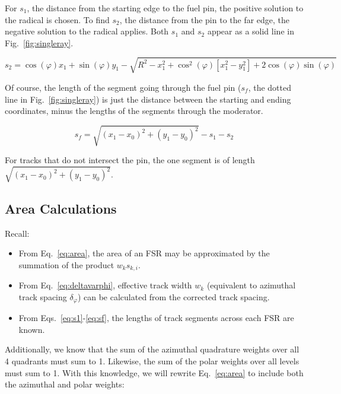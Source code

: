 \documentclass[12pt]{article}
\begin{document}
For $s_1$, the distance from the starting edge to the fuel pin, the positive solution to the radical is chosen. To find $s_2$, the distance from the pin to the far edge, the negative solution to the radical applies. Both $s_1$ and $s_2$ appear as a solid line in Fig.~\ref{fig:singleray}.

\begin{equation}\label{eq:s2}
s_2 = \cos(\varphi) x_1 + \sin(\varphi) y_1 -
\sqrt{ R^2 - x_1^2 +
\cos^2(\varphi) [x_1^2 - y_1^2] + 2 \cos(\varphi) \sin(\varphi)}
\end{equation}

Of course, the length of the segment going through the fuel pin ($s_f$, the dotted line in Fig.~\ref{fig:singleray}) is just the distance between the starting and ending coordinates, minus the lengths of the segments through the moderator.

\begin{equation}\label{eq:sf}
s_f = \sqrt{(x_1 - x_0)^2 + (y_1 - y_0)^2} - s_1 - s_2
\end{equation}

For tracks that do not intersect the pin, the one segment is of length $\sqrt{(x_1 - x_0)^2 + (y_1 - y_0)^2}$.

\newpage

\subsection{Area Calculations}\label{sec:area}

Recall:

\begin{itemize}
\item From Eq.~\ref{eq:area}, the area of an FSR may be approximated by the summation of the product $w_k s_{k,i}$.
\item From Eq.~\ref{eq:deltavarphi}, effective track width $w_k$ (equivalent to azimuthal track spacing $\delta_\varphi$) can be calculated from the corrected track spacing.
\item From Eqs.~\ref{eq:s1}-\ref{eq:sf}, the lengths of track segments across each FSR are known.
\end{itemize}

Additionally, we know that the sum of the azimuthal quadrature weights over all 4 quadrants must sum to 1. Likewise, the sum of the polar weights over all levels must sum to 1. With this knowledge, we will rewrite Eq.~\ref{eq:area} to include both the azimuthal and polar weights:
\end{document}
